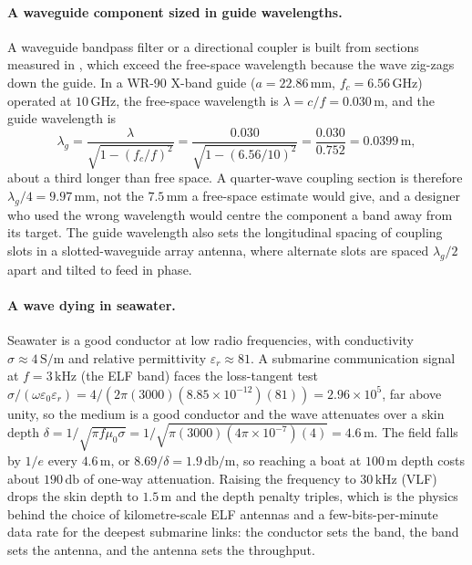 \paragraph{A waveguide component sized in guide wavelengths.}
A waveguide bandpass filter or a directional coupler is built from
sections measured in , which exceed the
free-space wavelength because the wave zig-zags down the guide. In a
WR-90 X-band guide ($a = 22.86\,\si{\milli\meter}$, $f_{c} = 6.56\,\si{
\giga\hertz}$) operated at $10\,\si{\giga\hertz}$, the free-space
wavelength is $\lambda = c/f = 0.030\,\si{\meter}$, and the guide
wavelength is
\[
\lambda_{g} = \frac{\lambda}{\sqrt{1 - (f_{c}/f)^{2}}} = \frac{0.030}
{\sqrt{1 - (6.56/10)^{2}}} = \frac{0.030}{0.752} = 0.0399\,\si{\meter},
\]
about a third longer than free space. A quarter-wave coupling section is
therefore $\lambda_{g}/4 = 9.97\,\si{\milli\meter}$, not the
$7.5\,\si{\milli\meter}$ a free-space estimate would give, and a designer
who used the wrong wavelength would centre the component a band away from
its target. The guide wavelength also sets the longitudinal spacing of
coupling slots in a slotted-waveguide array antenna, where alternate
slots are spaced $\lambda_{g}/2$ apart and tilted to feed in phase.

\paragraph{A wave dying in seawater.}
Seawater is a good conductor at low radio frequencies, with conductivity
$\sigma \approx 4\,\si{\siemens\per\meter}$ and relative permittivity
$\varepsilon_r \approx 81$. A submarine communication signal at $f =
3\,\si{\kilo\hertz}$ (the ELF band) faces the loss-tangent test
$\sigma/(\omega\varepsilon_0\varepsilon_r) = 4/(2\pi(3000)(8.85\times
10^{-12})(81)) = 2.96\times 10^{5}$, far above unity, so the medium is a
good conductor and the wave attenuates over a skin depth $\delta = 1/
\sqrt{\pi f\mu_0\sigma} = 1/\sqrt{\pi(3000)(4\pi\times 10^{-7})(4)} =
4.6\,\si{\meter}$. The field falls by $1/e$ every $4.6\,\si{\meter}$,
or $8.69/\delta = 1.9\,\si{\decibel\per\meter}$, so reaching a boat at
$100\,\si{\meter}$ depth costs about $190\,\si{\decibel}$ of one-way
attenuation. Raising the frequency to $30\,\si{\kilo\hertz}$ (VLF) drops
the skin depth to $1.5\,\si{\meter}$ and the depth penalty triples,
which is the physics behind the choice of kilometre-scale ELF antennas
and a few-bits-per-minute data rate for the deepest submarine links: the
conductor sets the band, the band sets the antenna, and the antenna sets
the throughput.

